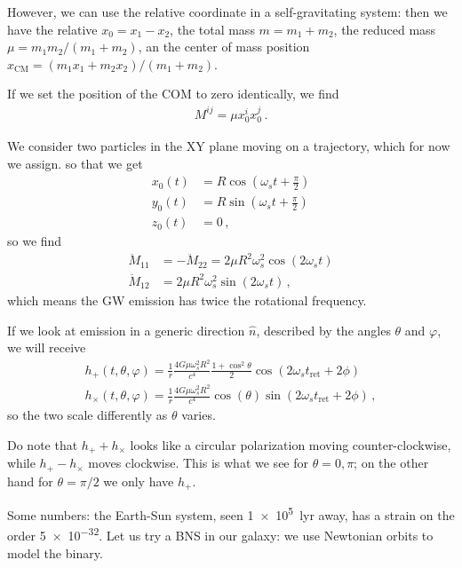 \documentclass[main.tex]{subfiles}
\begin{document}
However, we can use the relative coordinate in a self-gravitating system: then we have the relative \(x_0 = x_1 - x_2 \), the total mass \(m = m_1 + m_2 \), the reduced mass \(\mu = m_1 m_2 / (m_1 + m_2 )\), an the center of mass position \(x _{\text{CM}} = (m_1 x_1 +m_2 x_2 ) / (m_1 + m_2 )\). 

If we set the position of the COM to zero identically, we find 
%
\begin{align}
M^{ij} = \mu x^{i}_{0} x^{j}_{0}
\,.
\end{align}

We consider two particles in the XY plane moving on a trajectory, which for now we assign. so that we get 
%
\begin{align}
x_0 (t) &= R \cos(\omega_{s} t + \frac{\pi}{2}) \\
y_0 (t) &= R \sin(\omega_{s} t + \frac{\pi}{2}) \\
z_0 (t) &= 0
\,,
\end{align}
%
so we find 
%
\begin{align}
\ddot{M}_{11} &= - \ddot{M}_{22} = 2 \mu R^2 \omega_{s}^2 \cos(2 \omega_{s}t)  \\
\ddot{M}_{12} &= 2 \mu R^2\omega_{s}^2  \sin( 2 \omega_{s}t)
\,,
\end{align}
%
which means the GW emission has twice the rotational frequency. 

If we look at emission in a generic direction \(\hat{n}\), described by the angles \(\theta \) and \(\varphi \), we will receive 
%
\begin{align}
h_{+} (t, \theta , \varphi ) = \frac{1}{r} \frac{4G \mu \omega_{s}^2 R^2}{c^{4}} \frac{1 + \cos^2\theta }{2} \cos(2 \omega_{s}t _{\text{ret}} + 2 \phi ) \\
h_{ \times } (t, \theta , \varphi ) = \frac{1}{r} \frac{4G \mu \omega_{s}^2 R^2}{c^{4}} \cos(\theta ) \sin(2 \omega_{s}t _{\text{ret}} + 2 \phi )
\,,
\end{align}
%
so the two scale differently as \(\theta \) varies. 

Do note that \(h_{+} + h_{ \times }\) looks like a circular polarization moving counter-clockwise, while \(h_{+} - h_{ \times }\) moves clockwise. This is what we see for \(\theta = 0, \pi \); on the other hand for \(\theta = \pi /2\) we only have \(h_{+}\). 


Some numbers: the Earth-Sun system, seen \SI{1e5}{lyr} away, has a strain on the order \num{5e-32}. 
Let us try a BNS in our galaxy: we use Newtonian orbits to model the binary. 
\end{document}
